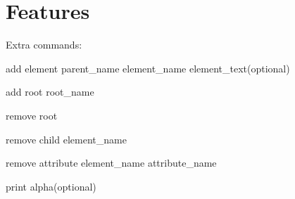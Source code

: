 \hypertarget{index_Features}{}\section{Features}\label{index_Features}
Extra commands\+:
\begin{DoxyItemize}
\item add element parent\+\_\+name element\+\_\+name element\+\_\+text(optional)
\item add root root\+\_\+name
\item remove root
\item remove child element\+\_\+name
\item remove attribute element\+\_\+name attribute\+\_\+name
\item print alpha(optional) 
\end{DoxyItemize}